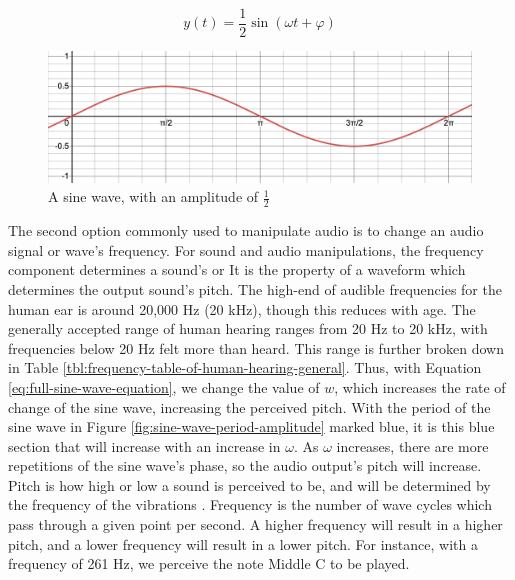 \begin{equation}\label{eq:half-sized-sine-wave}
	y(t) = \frac{1}{2} \sin(\omega t + \varphi)
\end{equation}

\begin{figure}[h]
	\centering
	\includegraphics[width=\textwidth]{figures/half-sized-sine-wave.png}
	\caption{A sine wave, with an amplitude of $\frac{1}{2}$}
	\label{fig:half-sized-sine-wave}
\end{figure}

The second option commonly used to manipulate audio is to change an audio signal or wave's frequency. For sound and audio manipulations, the frequency component determines a sound's  or  It is the property of a waveform which determines the output sound's pitch. The high-end of audible frequencies for the human ear is around 20,000 Hz (20 kHz), though this reduces with age. The generally accepted range of human hearing ranges from 20 Hz to 20 kHz, with frequencies below 20 Hz felt more than heard\cite{Rosen_Howell_2011}. This range is further broken down in Table \ref{tbl:frequency-table-of-human-hearing-general}. Thus, with Equation \ref{eq:full-sine-wave-equation}, we change the value of $w$, which increases the rate of change of the sine wave, increasing the perceived pitch. With the period of the sine wave in Figure \ref{fig:sine-wave-period-amplitude} marked blue, it is this blue section that will increase with an increase in $\omega$. As $\omega$ increases, there are more repetitions of the sine wave's phase, so the audio output's pitch will increase. Pitch is how high or low a sound is perceived to be, and will be determined by the frequency of the vibrations \cite{Toft_2020}. Frequency is the number of wave cycles which pass through a given point per second. A higher frequency will result in a higher pitch, and a lower frequency will result in a lower pitch. For instance, with a frequency of 261 Hz, we perceive the note Middle C to be played. 

